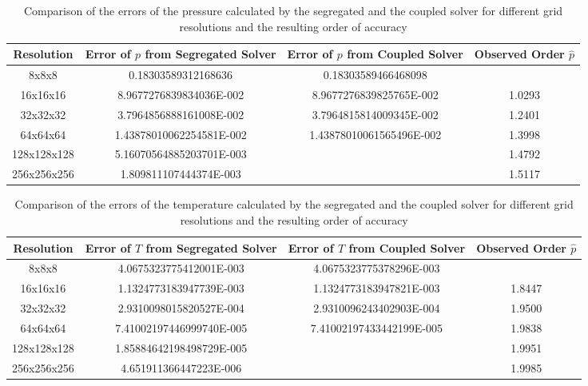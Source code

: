 \begin{table}[h!]\centering
{}
  \begin{tabular}{cccc}\toprule
    Resolution & Error of \(p\) from Segregated Solver & Error of \(p\) from Coupled Solver & Observed Order \(\hat{p}\) \\
    \midrule
    \rowcolor{black!20} 8x8x8       & 0.18303589312168636      &  0.18303589466468098      &        \\%
    \rowcolor{black!00} 16x16x16    & 8.9677276839834036E-002  &  8.9677276839825765E-002  & 1.0293 \\%
    \rowcolor{black!20} 32x32x32    & 3.7964856888161008E-002  &  3.7964815814009345E-002  & 1.2401 \\%
    \rowcolor{black!00} 64x64x64    & 1.43878010062254581E-002 &  1.43878010061565496E-002 & 1.3998 \\%
    \rowcolor{black!20} 128x128x128 & 5.16070564885203701E-003 &                           & 1.4792 \\%
    \rowcolor{black!00} 256x256x256 & 1.809811107444374E-003   &                           & 1.5117 \\%
  \end{tabular}
  \caption{Comparison of the errors of the pressure calculated by the segregated and the coupled solver for different grid resolutions and the resulting order of accuracy}
\end{table}

\begin{table}[h!]\centering
{}
  \begin{tabular}{cccc}\toprule
    Resolution & Error of \(T\) from Segregated Solver & Error of \(T\) from Coupled Solver & Observed Order \(\hat{p}\) \\
    \midrule
    \rowcolor{black!20} 8x8x8       & 4.0675323775412001E-003  & 4.0675323775378296E-003  &        \\%
    \rowcolor{black!00} 16x16x16    & 1.1324773183947739E-003  & 1.1324773183947821E-003  & 1.8447 \\%
    \rowcolor{black!20} 32x32x32    & 2.9310098015820527E-004  & 2.9310096243402903E-004  & 1.9500 \\%
    \rowcolor{black!00} 64x64x64    & 7.41002197446999740E-005 & 7.41002197433442199E-005 & 1.9838 \\%
    \rowcolor{black!20} 128x128x128 & 1.85884642198498729E-005 &                          & 1.9951 \\%
    \rowcolor{black!00} 256x256x256 & 4.651911366447223E-006   &                          & 1.9985 \\%
  \end{tabular}
  \caption{Comparison of the errors of the temperature calculated by the segregated and the coupled solver for different grid resolutions and the resulting order of accuracy}
\end{table}

